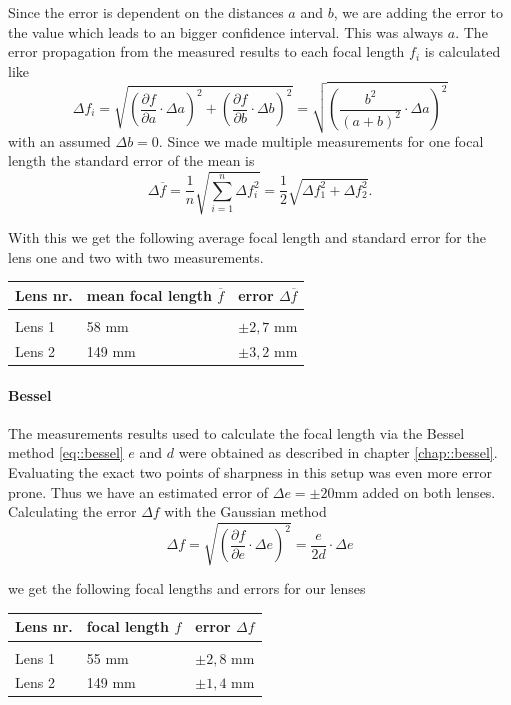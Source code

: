 Since the error is dependent on the distances $a$ and $b$, we are adding the error to the value which leads to an bigger confidence interval.
This was always $a$.
The error propagation from the measured results to each focal length $f_i$ is calculated like
\[
  \displaystyle	\Delta f_i = \sqrt{\left(\frac{\partial f}{\partial a} \cdot \Delta a \right)^2 +\left(\frac{\partial f}{\partial b} \cdot \Delta b\right)^2 } = \sqrt{\left(\frac{b^2}{(a+b)^2}\cdot \Delta a\right)^2}
\]
with an assumed $\Delta b = 0$. 
Since we made multiple measurements for one focal length the standard error of the mean is
\[
\displaystyle	\Delta \overline{f} =\frac{1}{n} \sqrt{\sum_{i=1}^{n}\Delta f_i^2} = \frac{1}{2}\sqrt{\Delta f_1^2 + \Delta f_2^2 }.
\label{eq::mean}
\]

With this we get the following average focal length and standard error for the lens one and two with two measurements.

	\begin{tabularx}{\textwidth}{XM{5cm}M{5cm}}%
		\toprule 
		Lens nr.& mean focal length $\overline{f}$ & error $\Delta \overline{f}$\\
		\hline
		&&\\[-5pt]
		Lens 1	& 58 \si{\milli \m} & $\pm 2,7$ \si{\milli \m}	\\
		Lens 2	& 149 \si{\milli \m} & $\pm 3,2$ \si{\milli \m}	\\
		

		\bottomrule 
	\end{tabularx}

\paragraph{Bessel}
The measurements results used to calculate the focal length via the Bessel method \ref{eq::bessel} $e$ and $d$ were obtained as described in chapter \ref{chap::bessel}.
Evaluating the exact two points of sharpness in this setup was even more error prone.
Thus we have an estimated error of $\Delta e= \pm 20$\si{\milli\m} added on both lenses.
Calculating the error $\Delta f$ with the Gaussian method
\[
\displaystyle	\Delta f = \sqrt{\left(\frac{\partial f}{\partial e} \cdot \Delta e \right)^2 } = \frac{e}{2d}\cdot \Delta e
\]

we get the following focal lengths and errors for our lenses

\begin{tabularx}{\textwidth}{XM{5cm}M{5cm}}%
	\toprule 
	Lens nr.&focal length $f$ & error $\Delta f$\\
	\hline
	&&\\[-5pt]
	Lens 1	& 55 \si{\milli \m} & $\pm 2,8$ \si{\milli \m}	\\
	Lens 2	& 149 \si{\milli \m} & $\pm 1,4$ \si{\milli \m}	\\	
	\bottomrule 
\end{tabularx}

